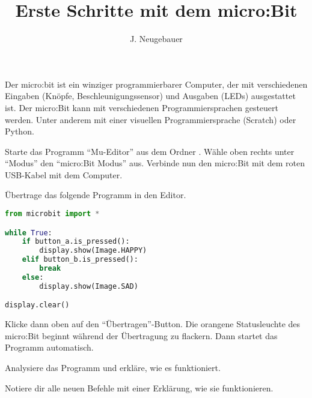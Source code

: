 \documentclass[10pt, a4paper]{scrartcl}
\author{J. Neugebauer}
\title{Erste Schritte mit dem micro:Bit}
\date{\Heute}
\begin{document}
\ReiheTitel

Der micro:bit ist ein winziger programmierbarer Computer, der mit verschiedenen Eingaben (Knöpfe, Beschleunigungssensor) und Ausgaben (LEDs) ausgestattet ist. Der micro:Bit kann mit verschiedenen Programmiersprachen gesteuert werden. Unter anderem mit einer visuellen Programmiersprache (Scratch) oder Python.

\begin{aufgabe}[symbol=\symLaptop]
	Starte das Programm \enquote{Mu-Editor} aus dem Ordner . Wähle oben rechts unter \enquote{Modus} den \enquote{micro:Bit Modus} aus. Verbinde nun den micro:Bit mit dem roten USB-Kabel mit dem Computer.
\end{aufgabe}

\begin{aufgabe}[symbol=\symLaptop]
	Übertrage das folgende Programm in den Editor.
	
	\begin{lstlisting}[language=Python]
from microbit import *

while True:
    if button_a.is_pressed():
        display.show(Image.HAPPY)
    elif button_b.is_pressed():
        break
    else:
        display.show(Image.SAD)

display.clear()
	\end{lstlisting}
	
	Klicke dann oben auf den \enquote{Übertragen}-Button. Die orangene Statusleuchte des micro:Bit beginnt während der Übertragung zu flackern. Dann startet das Programm automatisch.
	
\end{aufgabe}

\begin{aufgabe}[symbol=\symBuch]
	Analysiere das Programm und erkläre, wie es funktioniert.
	
	Notiere dir alle neuen Befehle mit einer Erklärung, wie sie funktionieren.
\end{aufgabe}
\end{document}
